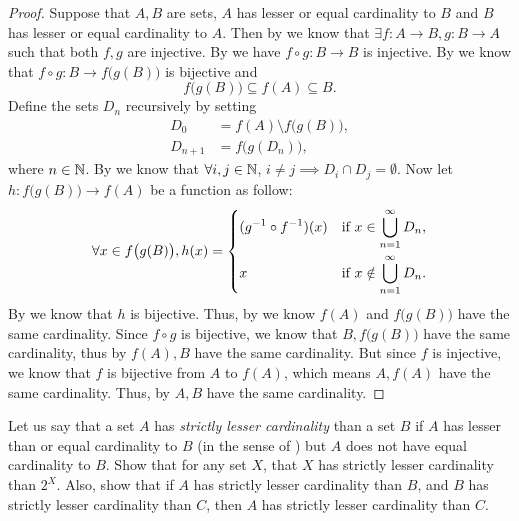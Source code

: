 \begin{proof}
  Suppose that \(A, B\) are sets, \(A\) has lesser or equal cardinality to \(B\) and \(B\) has lesser or equal cardinality to \(A\).
  Then by  we know that \(\exists f : A \to B, g : B \to A\) such that both \(f, g\) are injective.
  By  we have \(f \circ g : B \to B\) is injective.
  By  we know that \(f \circ g : B \to f\big(g(B)\big)\) is bijective and
  \[
    f\big(g(B)\big) \subseteq f(A) \subseteq B.
  \]
  Define the sets \(D_n\) recursively by setting
  \begin{align*}
    D_0       & = f(A) \setminus f\big(g(B)\big), \\
    D_{n + 1} & = f\big(g(D_n)\big),
  \end{align*}
  where \(n \in \mathbb{N}\).
  By  we know that \(\forall i, j \in \mathbb{N}\), \(i \neq j \implies D_i \cap D_j = \emptyset\).
  Now let \(h : f\big(g(B)\big) \to f(A)\) be a function as follow:
  \[
    \forall x \in f\big(g(B)\big), h(x) = \begin{dcases}
      (g^{-1} \circ f^{-1})(x) & \text{if } x \in \bigcup_{n = 1}^\infty D_n,    \\
      x                        & \text{if } x \notin \bigcup_{n = 1}^\infty D_n.
    \end{dcases}
  \]
  By  we know that \(h\) is bijective.
  Thus, by  we know \(f(A)\) and \(f\big(g(B)\big)\) have the same cardinality.
  Since \(f \circ g\) is bijective, we know that \(B, f\big(g(B)\big)\) have the same cardinality, thus by  \(f(A), B\) have the same cardinality.
  But since \(f\) is injective, we know that \(f\) is bijective from \(A\) to \(f(A)\), which means \(A, f(A)\) have the same cardinality.
  Thus, by  \(A, B\) have the same cardinality.
\end{proof}

\begin{ex}\label{i:ex:8.3.4}
  Let us say that a set \(A\) has \emph{strictly lesser cardinality} than a set \(B\) if \(A\) has lesser than or equal cardinality to \(B\) (in the sense of ) but \(A\) does not have equal cardinality to \(B\).
  Show that for any set \(X\), that \(X\) has strictly lesser cardinality than \(2^X\).
  Also, show that if \(A\) has strictly lesser cardinality than \(B\), and \(B\) has strictly lesser cardinality than \(C\), then \(A\) has strictly lesser cardinality than \(C\).
\end{ex}

